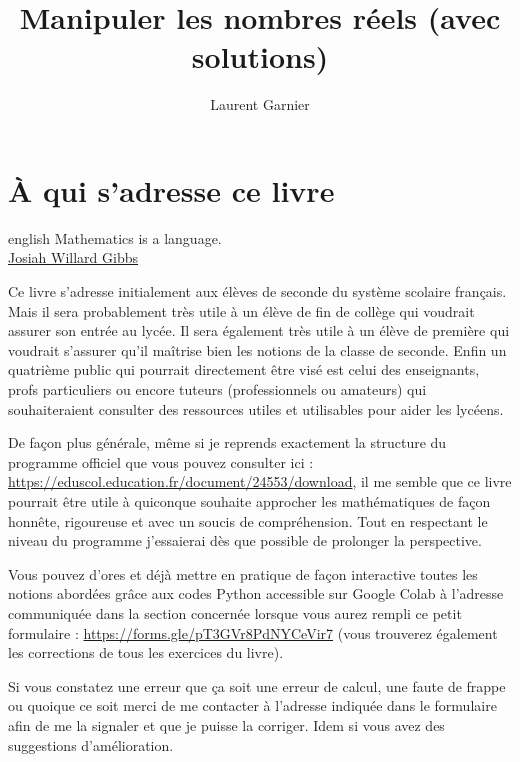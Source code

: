 \documentclass[a4paper, 11pt, twoside]{book}
\author{Laurent Garnier}
\date{}
\title{Manipuler les nombres réels (avec solutions)}
\begin{document}
\maketitle
\tableofcontents


\part{À qui s'adresse ce livre}
\label{sec:orge6d6875}
\begin{foreigndisplayquote}{english}
Mathematics is a language.\\

\href{https://en.wikipedia.org/wiki/Josiah\_Willard\_Gibbs}{Josiah Willard Gibbs}
\end{foreigndisplayquote}

Ce livre s'adresse initialement aux élèves de seconde du système
scolaire français. Mais il sera probablement très utile à un élève
de fin de collège qui voudrait assurer son entrée au lycée. Il sera
également très utile à un élève de première qui voudrait s'assurer
qu'il maîtrise bien les notions de la classe de seconde. Enfin un
quatrième public qui pourrait directement être visé est celui des
enseignants, profs particuliers ou encore tuteurs (professionnels ou
amateurs) qui souhaiteraient consulter des ressources utiles et
utilisables pour aider les lycéens.

De façon plus générale, même si je reprends exactement la structure
du programme officiel que vous pouvez consulter ici :
\url{https://eduscol.education.fr/document/24553/download}, il me semble
que ce livre pourrait être utile à quiconque souhaite approcher les
mathématiques de façon honnête, rigoureuse et avec un soucis de
compréhension. Tout en respectant le niveau du programme j'essaierai
dès que possible de prolonger la perspective.

Vous pouvez d'ores et déjà mettre en pratique de façon interactive
toutes les notions abordées grâce aux codes Python accessible sur
Google Colab à l'adresse communiquée dans la section concernée
lorsque vous aurez rempli ce petit formulaire :
\url{https://forms.gle/pT3GVr8PdNYCeVir7} (vous trouverez également les
corrections de tous les exercices du livre).

Si vous constatez une erreur que ça soit une erreur de calcul, une
faute de frappe ou quoique ce soit merci de me contacter à l'adresse
indiquée dans le formulaire afin de me la signaler et que je puisse
la corriger. Idem si vous avez des suggestions d'amélioration.
\end{document}
